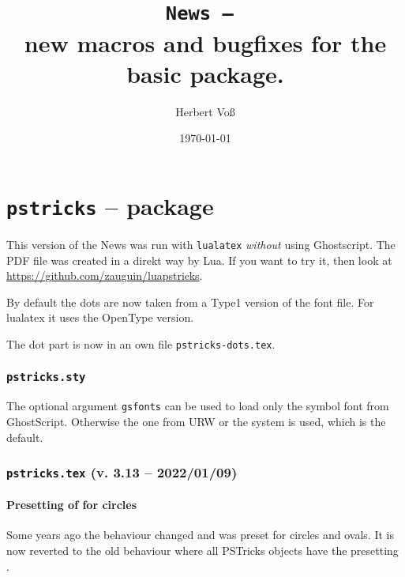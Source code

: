 \documentclass[11pt,english,BCOR=10mm,DIV=12,bibliography=totoc,parskip=false,headings=small,
    headinclude=false,footinclude=false,twoside,usegeometry,dvipsnames]{pst-doc}
\begin{document}
\title{\texttt{News -- \the\year}\\ \Large new macros and bugfixes for the basic package.}
\author{Herbert Voß}
\date{\today}

\settitle

\tableofcontents

\part{\texttt{pstricks} -- package}

This version of the News was run with \verb|lualatex| \emph{without} using Ghostscript.
The PDF file was created in a direkt way by Lua. If you want to try it, then look
at \url{https://github.com/zauguin/luapstricks}.

By default the dots are now taken from a Type1 version of the font file. For
lualatex it uses the OpenType version.

The dot part is now in an own file \texttt{pstricks-dots.tex}.





\section{\texttt{pstricks.sty}}
The optional argument \texttt{gsfonts} can be used to load only the symbol font from GhostScript.
Otherwise the one from URW or the system is used, which is the default.



\section{\texttt{pstricks.tex} (v. 3.13 -- 2022/01/09)}

\subsection{Presetting of  for circles}
Some years ago the behaviour changed and  was preset for circles and ovals.
It is now reverted to the old behaviour where all PSTricks objects have the presetting .
\end{document}
